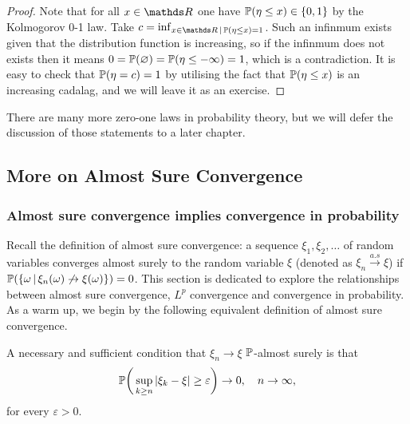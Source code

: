 \begin{proof}
Note that for all $x \in \R$ one have $\mathbb{P}(\eta \leq x) \in \left\{ 0,1 \right \}$ by the Kolmogorov 0-1 law. Take $c = \inf_{x \in \R \,|\, \p(\eta \leq x) = 1}$. Such an infinmum exists given that the distribution function is increasing, so if the infinmum does not exists then it means $0 = \mathbb{P}(\varnothing) = \mathbb{P}(\eta \leq -\infty) = 1$, which is a contradiction. It is easy to check that $\mathbb{P}(\eta = c) = 1$ by utilising the fact that $\mathbb{P}(\eta \leq x)$ is an increasing cadalag, and we will leave it as an exercise.
\end{proof}

There are many more zero-one laws in probability theory, but we will defer the discussion of those statements to a later chapter.
\newpage 

\subsection{More on Almost Sure Convergence}
\subsubsection{Almost sure convergence implies convergence in probability}
Recall the definition of almost sure convergence: a sequence $\xi_1, \xi_2, \dots$ of random variables converges almost surely to the random variable $\xi$ (denoted as $\xi_n \xrightarrow{a.s} \xi$) if $\mathbb{P}(\left\{ \omega \,|\, \xi_n(\omega) \not \to \xi(\omega) \right \}) = 0$. This section is dedicated to explore the relationships between almost sure convergence, $L^p$ convergence and convergence in probability. As a warm up, we begin by the following equivalent definition of almost sure convergence.

\begin{proposition} \label{prop:as_prob_conv}
A necessary and sufficient condition that $\xi_n \to \xi$ $\mathbb{P}$-almost surely is that 
\begin{equation*}
    \mathbb{P} \bigg(\sup_{k \ge n} |\xi_k - \xi| \ge \varepsilon\bigg) \to 0, \quad n \to \infty,
\end{equation*}
    for every $\varepsilon > 0$.
\end{proposition}

